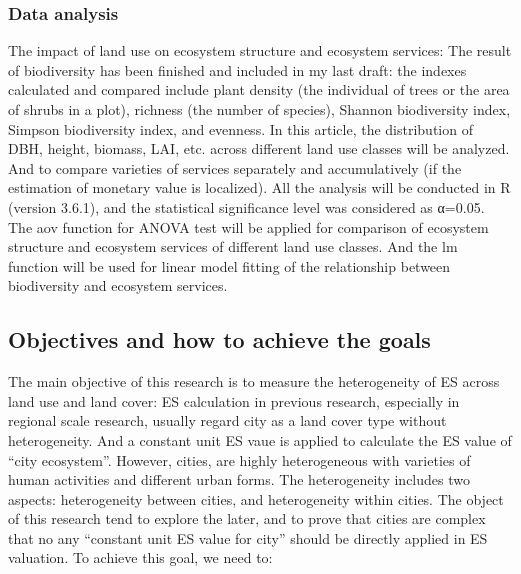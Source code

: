 \documentclass[
]{article}
\begin{document}
\hypertarget{data-analysis}{%
\subsubsection{Data analysis}\label{data-analysis}}

The impact of land use on ecosystem structure and ecosystem services: The result of biodiversity has been finished and included in my last draft: the indexes calculated and compared include plant density (the individual of trees or the area of shrubs in a plot), richness (the number of species), Shannon biodiversity index, Simpson biodiversity index, and evenness. In this article, the distribution of DBH, height, biomass, LAI, etc. across different land use classes will be analyzed. And to compare varieties of services separately and accumulatively (if the estimation of monetary value is localized).
All the analysis will be conducted in R (version 3.6.1), and the statistical significance level was considered as α=0.05. The aov function for ANOVA test will be applied for comparison of ecosystem structure and ecosystem services of different land use classes. And the lm function will be used for linear model fitting of the relationship between biodiversity and ecosystem services.

\hypertarget{objectives-and-how-to-achieve-the-goals}{%
\subsection{Objectives and how to achieve the goals}\label{objectives-and-how-to-achieve-the-goals}}

The main objective of this research is to measure the heterogeneity of ES across land use and land cover: ES calculation in previous research, especially in regional scale research, usually regard city as a land cover type without heterogeneity. And a constant unit ES vaue is applied to calculate the ES value of ``city ecosystem''. However, cities, are highly heterogeneous with varieties of human activities and different urban forms. The heterogeneity includes two aspects: heterogeneity between cities, and heterogeneity within cities. The object of this research tend to explore the later, and to prove that cities are complex that no any ``constant unit ES value for city'' should be directly applied in ES valuation. To achieve this goal, we need to:
\end{document}
